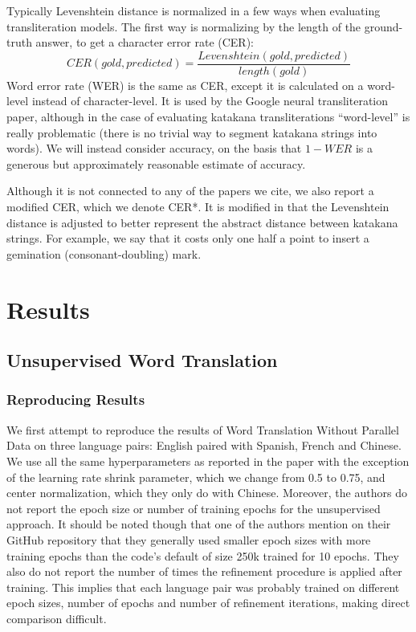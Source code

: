 \documentclass{article}
\begin{document}
Typically Levenshtein distance is normalized in a few ways
when evaluating transliteration models.
The first way is normalizing by the length of the ground-truth answer,
to get a character error rate (CER):
$$CER(gold, predicted) = \frac{Levenshtein(gold, predicted)}{length(gold)}$$
Word error rate (WER) is the same as CER,
except it is calculated on a word-level instead of character-level.
It is used by the Google neural transliteration paper,
although in the case of evaluating katakana transliterations
``word-level'' is really problematic
(there is no trivial way to segment katakana strings into words).
We will instead consider accuracy,
on the basis that $1 - WER$
is a generous but approximately reasonable estimate of accuracy.

Although it is not connected to any of the papers we cite,
we also report a modified CER,
which we denote CER*.
It is modified in that the Levenshtein distance
is adjusted to better represent the abstract distance between katakana strings.
For example,
we say that it costs only one half a point
to insert a gemination (consonant-doubling) mark.

\section*{Results}

\subsection*{Unsupervised Word Translation}

\subsubsection*{Reproducing Results}

We first attempt to reproduce the results of Word Translation Without Parallel
Data on three language pairs: English paired with Spanish, French and Chinese.
We use all the same hyperparameters as reported in the paper with the exception
of the learning rate shrink parameter, which we change from 0.5 to 0.75, and
center normalization, which they only do with Chinese.
Moreover, the authors do not report the epoch size or number of training epochs
for the unsupervised approach. It should be noted though that one of the authors 
mention on their GitHub repository that they generally used smaller epoch sizes
with more training epochs than the code's default of size 250k trained for 10
epochs. They also do not report the number of times the refinement procedure
is applied after training. This implies that each language pair was probably
trained on different epoch sizes, number of epochs and number of refinement
iterations, making direct comparison difficult.
\end{document}
